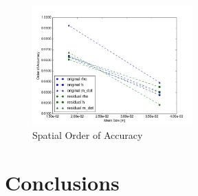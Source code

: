 \documentclass{mc2015}
\begin{document}
\begin{figure}[!h]
	\centering
	\includegraphics[width=0.55\textwidth]{images/Spatial_Study/Order_Of_Accuracy_Summary}
	\caption{Spatial Order of Accuracy}
	\label{fig:Spatial:OOA}
\end{figure}

%
%
%
%
%
%
%
%

\section{Conclusions}
\end{document}
